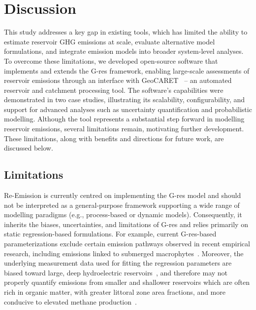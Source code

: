 \documentclass[review, authoryear, 1p]{elsarticle} %
\begin{document}
\section{Discussion}
\label{sec:discussion}

This study addresses a key gap in existing tools, which has limited the ability to estimate reservoir \ac{GHG} emissions at scale, evaluate alternative model formulations, and integrate emission models into broader system-level analyses.
To overcome these limitations, we developed open-source software that implements and extends the G-res framework, enabling large-scale assessments of reservoir emissions through an interface with GeoCARET~\citep{heettool} -- an automated reservoir and catchment processing tool.
The software's capabilities were demonstrated in two case studies, illustrating its scalability, configurability, and support for advanced analyses such as uncertainty quantification and probabilistic modelling.
Although the tool represents a substantial step forward in modelling reservoir emissions, several limitations remain, motivating further development.
These limitations, along with benefits and directions for future work, are discussed below.

\subsection{Limitations}
\label{subsec:limitations}

Re-Emission is currently centred on implementing the G-res model and should not be interpreted as a general-purpose framework supporting a wide range of modelling paradigms (e.g., process-based or dynamic models).
Consequently, it inherits the biases, uncertainties, and limitations of G-res and relies primarily on static regression-based formulations.
For example, current G-res-based parameterizations exclude certain emission pathways observed in recent empirical research, including emissions linked to submerged macrophytes~\citep{Hilt2022, Suraj2023}.
Moreover, the underlying measurement data used for fitting the regression parameters are biased toward large, deep hydroelectric reservoirs~\citep{Hansen2022}, and therefore may not properly quantify emissions from smaller and shallower reservoirs which are often rich in organic matter, with greater littoral zone area fractions, and more conducive to elevated methane production~\citep{WANG2025123441, SHI2025}. 
\end{document}
